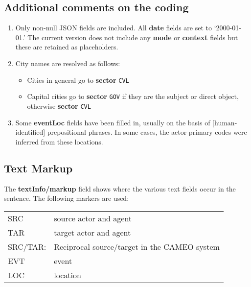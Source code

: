 \documentclass[11pt, oneside]{article}   	%
\newcommand{\field}[1]{\textsf{\textbf{#1}}}
\newcommand{\code}[1]{\texttt{#1}}
\begin{document}
\subsection*{Additional comments on the coding}
\begin{enumerate}
\item  Only non-null JSON fields are included. All \field{date} fields are set to `2000-01-01.' The current version does not include
       any \field{mode} or \field{context} fields but these are retained as placeholders.
    
\item City names are resolved as follows:
	\begin{itemize}
	\item Cities in general go to \field{sector} \code{CVL}
	\item  Capital cities go to  \field{sector} \code{GOV} if they are the subject or direct object, otherwise  \field{sector} \code{CVL}
	\end{itemize}
       
\item Some \field{eventLoc} fields have been filled in, usually on the basis of [human-identified] prepositional phrases. In 
       some cases, the actor primary codes were inferred from these locations.

\end{enumerate}
    
\subsection*{Text Markup}

    The \field{textInfo/markup} field shows where the various text fields occur in the sentence. The following markers are 
    used:
      
\begin{table}[htdp]
\begin{center}
\begin{tabular}{ll}
    SRC & source actor and agent \\
    TAR & target actor and agent\\
    SRC/TAR: & Reciprocal source/target in the CAMEO system\\
    EVT & event\\
    LOC & location\\

\end{tabular}
\end{center}
\end{table}%
\end{document}
